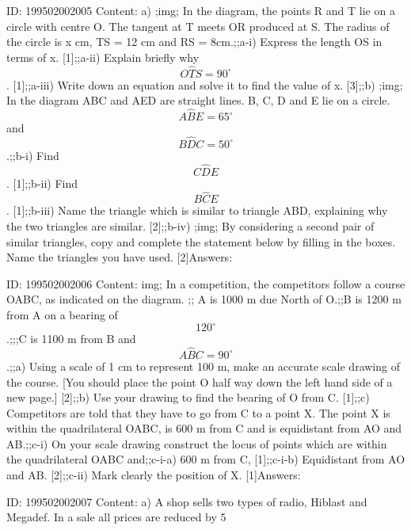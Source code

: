 \documentclass{article}
\begin{document}
ID: 199502002005
Content:
a) ;img; In the diagram, the points R and T lie on a circle with centre O. The tangent at T meets  OR produced at S. The radius of the circle is x cm, TS = 12 cm and RS = 8cm.;;a-i) Express the length OS in terms of x. [1];;a-ii) Explain briefly why $$O \hat TS = 90^{\circ}$$. [1];;a-iii) Write down an equation and solve it to find the value of x. [3];;b) ;img; In the diagram ABC and AED are straight lines. B, C, D and E lie on a circle. $$A \hat BE = 65^{\circ}$$ and $$B \hat DC = 50^{\circ}$$.;;b-i) Find $$C \hat DE$$. [1];;b-ii) Find $$B \hat CE$$. [1];;b-iii) Name the triangle which is similar to triangle ABD, explaining why the two triangles are similar. [2];;b-iv) ;img; By considering a second pair of similar triangles, copy and complete the statement below by filling in the boxes. Name the triangles you have used. [2]Answers:

ID: 199502002006
Content:
img; In a competition, the competitors follow a course OABC, as indicated on the diagram. ;; A is 1000 m due North of O.;;B is 1200 m from A on a bearing of $$120^{\circ}$$.;;;C is 1100 m from B and $$A \hat BC = 90^{\circ}$$.;;a) Using a scale of 1 cm to represent 100 m, make an accurate scale drawing of the course. [You should place the point O half way down the left hand side of a new page.] [2];;b) Use your drawing to find the bearing of O from C. [1];;c) Competitors are told that they have to go from C to a point X. The point X is within the quadrilateral OABC, is 600 m from C and is equidistant from AO and AB.;;c-i) On your scale drawing construct the locus of points which are within the quadrilateral OABC and;;c-i-a) 600 m from C, [1];;c-i-b) Equidistant from AO and AB. [2];;c-ii) Mark clearly the position of X. [1]Answers:

ID: 199502002007
Content:
a) A shop sells two types of radio, Hiblast and Megadef. In a sale all prices are reduced by 5%
\end{document}
